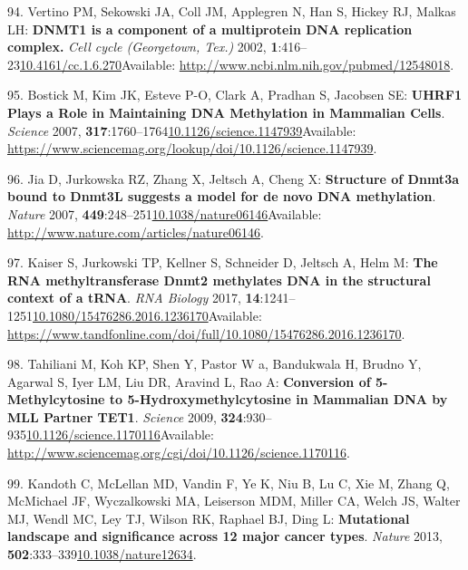 \documentclass[
]{book}
\begin{document}
\leavevmode\hypertarget{ref-Vertino2002}{}%
94. Vertino PM, Sekowski JA, Coll JM, Applegren N, Han S, Hickey RJ, Malkas LH: \textbf{DNMT1 is a component of a multiprotein DNA replication complex.} \emph{Cell cycle (Georgetown, Tex.)} 2002, \textbf{1}:416--23\href{https://doi.org/10.4161/cc.1.6.270}{10.4161/cc.1.6.270}Available: \url{http://www.ncbi.nlm.nih.gov/pubmed/12548018}.

\leavevmode\hypertarget{ref-Bostick2007}{}%
95. Bostick M, Kim JK, Esteve P-O, Clark A, Pradhan S, Jacobsen SE: \textbf{UHRF1 Plays a Role in Maintaining DNA Methylation in Mammalian Cells}. \emph{Science} 2007, \textbf{317}:1760--1764\href{https://doi.org/10.1126/science.1147939}{10.1126/science.1147939}Available: \url{https://www.sciencemag.org/lookup/doi/10.1126/science.1147939}.

\leavevmode\hypertarget{ref-Jia2009}{}%
96. Jia D, Jurkowska RZ, Zhang X, Jeltsch A, Cheng X: \textbf{Structure of Dnmt3a bound to Dnmt3L suggests a model for de novo DNA methylation}. \emph{Nature} 2007, \textbf{449}:248--251\href{https://doi.org/10.1038/nature06146}{10.1038/nature06146}Available: \url{http://www.nature.com/articles/nature06146}.

\leavevmode\hypertarget{ref-Kaiser2017}{}%
97. Kaiser S, Jurkowski TP, Kellner S, Schneider D, Jeltsch A, Helm M: \textbf{The RNA methyltransferase Dnmt2 methylates DNA in the structural context of a tRNA}. \emph{RNA Biology} 2017, \textbf{14}:1241--1251\href{https://doi.org/10.1080/15476286.2016.1236170}{10.1080/15476286.2016.1236170}Available: \url{https://www.tandfonline.com/doi/full/10.1080/15476286.2016.1236170}.

\leavevmode\hypertarget{ref-Tahiliani2009}{}%
98. Tahiliani M, Koh KP, Shen Y, Pastor W a, Bandukwala H, Brudno Y, Agarwal S, Iyer LM, Liu DR, Aravind L, Rao A: \textbf{Conversion of 5-Methylcytosine to 5-Hydroxymethylcytosine in Mammalian DNA by MLL Partner TET1}. \emph{Science} 2009, \textbf{324}:930--935\href{https://doi.org/10.1126/science.1170116}{10.1126/science.1170116}Available: \url{http://www.sciencemag.org/cgi/doi/10.1126/science.1170116}.

\leavevmode\hypertarget{ref-Kandoth2013}{}%
99. Kandoth C, McLellan MD, Vandin F, Ye K, Niu B, Lu C, Xie M, Zhang Q, McMichael JF, Wyczalkowski MA, Leiserson MDM, Miller CA, Welch JS, Walter MJ, Wendl MC, Ley TJ, Wilson RK, Raphael BJ, Ding L: \textbf{Mutational landscape and significance across 12 major cancer types}. \emph{Nature} 2013, \textbf{502}:333--339\href{https://doi.org/10.1038/nature12634}{10.1038/nature12634}.
\end{document}
